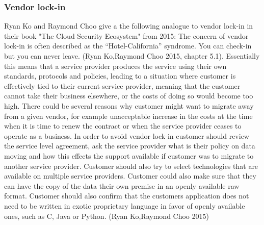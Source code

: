 \documentclass{article}
\begin{document}
\subsubsection{Vendor lock-in}
Ryan Ko and Raymond Choo give a the following analogue to vendor lock-in in their book "The Cloud Security Ecosystem" from 2015: The concern of vendor lock-in is often described as the “Hotel-California” syndrome. You can check-in but you can never leave. (Ryan Ko,Raymond Choo 2015, chapter 5.1).
Essentially this means that a service provider produces the service using their own standards, protocols and policies, leading to a situation where customer is effectively tied to their current service provider, meaning that the customer cannot take their business elsewhere, or the costs of doing so would become too high. There could be several reasons why customer might want to migrate away from a given vendor, for example unacceptable increase in the costs at the time when it is time to renew the contract or when the service provider ceases to operate as a business. In order to avoid vendor lock-in customer should review the service level agreement, ask the service provider what is their policy on data moving and how this effects the support available if customer was to migrate to another service provider. Customer should also try to select technologies that are available on multiple service providers. Customer could also make sure that they can have the copy of the data their own premise in an openly available raw format. Customer should also confirm that the customers application does not need to be written in exotic proprietary language in favor of openly available ones, such as C, Java or Python. (Ryan Ko,Raymond Choo 2015)
\end{document}
